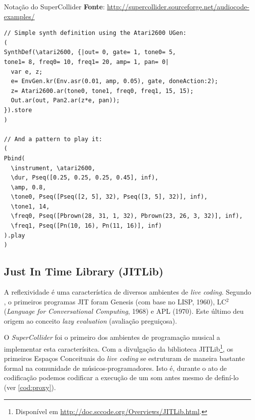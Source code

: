 \begin{example}{Notação do SuperCollider}
\textbf{Fonte}: \url{http://supercollider.sourceforge.net/audiocode-examples/}

\begin{lstlisting}[style=SuperCollider-IDE]
// Simple synth definition using the Atari2600 UGen:
(
SynthDef(\atari2600, {|out= 0, gate= 1, tone0= 5,
tone1= 8, freq0= 10, freq1= 20, amp= 1, pan= 0|
  var e, z;
  e= EnvGen.kr(Env.asr(0.01, amp, 0.05), gate, doneAction:2);
  z= Atari2600.ar(tone0, tone1, freq0, freq1, 15, 15);
  Out.ar(out, Pan2.ar(z*e, pan));
}).store
)

// And a pattern to play it:
(
Pbind(
  \instrument, \atari2600,
  \dur, Pseq([0.25, 0.25, 0.25, 0.45], inf),
  \amp, 0.8,
  \tone0, Pseq([Pseq([2, 5], 32), Pseq([3, 5], 32)], inf),
  \tone1, 14,
  \freq0, Pseq([Pbrown(28, 31, 1, 32), Pbrown(23, 26, 3, 32)], inf),
  \freq1, Pseq([Pn(10, 16), Pn(11, 16)], inf)
).play
)
\end{lstlisting}
\end{example}\label{ex:artificial}

\subsection{Just In Time Library (JITLib)}\label{sec:jit}

A reflexividade  é uma característica de diversos ambientes de \emph{live coding}. Segundo , o primeiros programas JIT foram Genesis (com base no LISP, 1960), LC$^2$ (\emph{Language for Conversational Computing}, 1968) e APL (1970). Este último deu origem ao conceito \emph{lazy evaluation} (avaliação preguiçosa). 

O \emph{SuperCollider} foi o primeiro dos ambientes de programação musical a implementar esta caracterísitca. Com a divulgação da biblioteca JITLib\footnote{Disponível em \url{http://doc.sccode.org/Overviews/JITLib.html}.}, os primeiros Espaços Conceituais do \emph{live coding} se estruturam de maneira bastante formal na comunidade de músicos-programadores. Isto é, durante o ato de codificação podemos codificar a execução de um som antes mesmo de definí-lo (ver \autoref{cod:proxy}).

